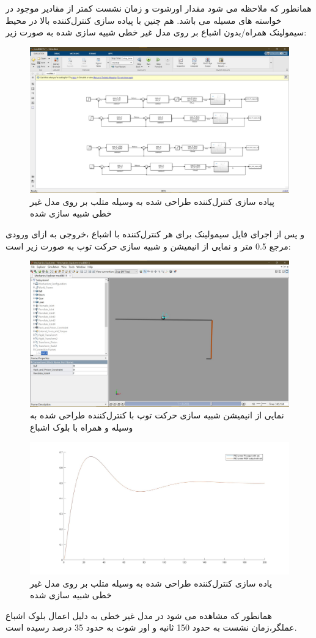 همانطور که ملاحظه می شود مقدار اورشوت و زمان نشست کمتر از مقادیر موجود در خواسته های مسیله می باشد.
هم چنین با پیاده سازی کنترل‌کننده بالا در محیط سیمولینک همراه/بدون اشباع بر روی مدل غیر خطی شبیه سازی شده به صورت زیر:
\begin{figure}[H]
	\centering
	\includegraphics[width=12cm]{../Figure/P_II/simmechanic_simulink.jpg}
	\caption{پیاده سازی کنترل‌کننده طراحی شده به وسیله  متلب بر روی مدل غیر خطی شبیه سازی شده}
\end{figure}

و پس از اجرای فایل سیمولینک برای هر کنترل‌کننده با اشباع ،خروجی به ازای ورودی مرجع 0.5 متر و نمایی از انیمیشن و شبیه سازی حرکت توپ به صورت زیر است:
\begin{figure}[H]
	\centering
	\includegraphics[width=12cm]{../Figure/P_II/simmechanic1.jpg}
	\caption{نمایی از انیمیشن شبیه سازی حرکت توپ با کنترل‌کننده طراحی شده به وسیله  و همراه با بلوک اشباع}
\end{figure}
\begin{figure}[H]
	\centering
	\includegraphics[width=12cm]{../Figure/P_II/simmechanic.jpg}
	\caption{یاده سازی کنترل‌کننده طراحی شده به وسیله  متلب بر روی مدل غیر خطی شبیه سازی شده}
\end{figure}

همانطور که مشاهده می شود در مدل غیر خطی به دلیل اعمال بلوک اشباع عملگر،زمان نشست به حدود 150 ثانیه و اور شوت به حدود 35 درصد رسیده است.